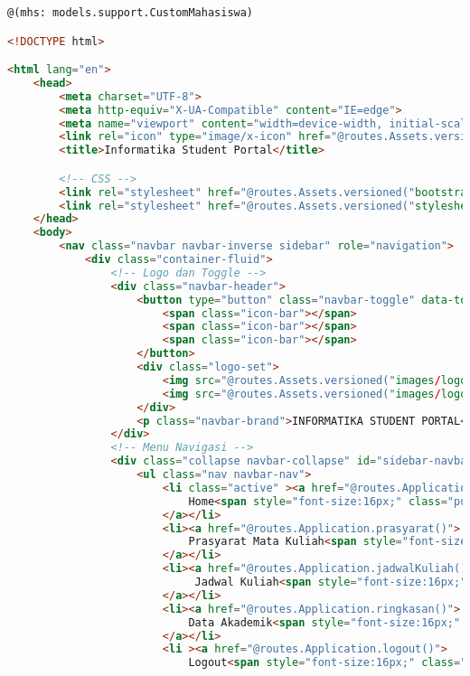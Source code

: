 \singlespacing 
\begin{lstlisting}[language=html,basicstyle=\tiny,caption=home.scala.html]
@(mhs: models.support.CustomMahasiswa)

<!DOCTYPE html>

<html lang="en">
    <head>
        <meta charset="UTF-8">
		<meta http-equiv="X-UA-Compatible" content="IE=edge">
        <meta name="viewport" content="width=device-width, initial-scale=1">
        <link rel="icon" type="image/x-icon" href="@routes.Assets.versioned("images/logo-IT.png")" />
		<title>Informatika Student Portal</title>

		<!-- CSS -->
        <link rel="stylesheet" href="@routes.Assets.versioned("bootstrap/css/bootstrap.min.css")">
        <link rel="stylesheet" href="@routes.Assets.versioned("stylesheets/main.css")"> 
    </head>
    <body>
		<nav class="navbar navbar-inverse sidebar" role="navigation">
			<div class="container-fluid">
				<!-- Logo dan Toggle -->
				<div class="navbar-header">
					<button type="button" class="navbar-toggle" data-toggle="collapse" data-target="#sidebar-navbar-collapse">
						<span class="icon-bar"></span>
						<span class="icon-bar"></span>
						<span class="icon-bar"></span>
					</button>
					<div class="logo-set">
						<img src="@routes.Assets.versioned("images/logo-unpar.png")" width="25%" height="25%"/>
						<img src="@routes.Assets.versioned("images/logo-IT.png")" width="25%" height="25%"/>
					</div>
					<p class="navbar-brand">INFORMATIKA STUDENT PORTAL</p>
				</div>
				<!-- Menu Navigasi -->
				<div class="collapse navbar-collapse" id="sidebar-navbar-collapse">
					<ul class="nav navbar-nav">
						<li class="active" ><a href="@routes.Application.home()">
							Home<span style="font-size:16px;" class="pull-right hidden-xs showopacity glyphicon glyphicon-home"></span>
						</a></li>
						<li><a href="@routes.Application.prasyarat()">
							Prasyarat Mata Kuliah<span style="font-size:16px;" class="pull-right hidden-xs showopacity glyphicon glyphicon-tasks"></span>
						</a></li>
						<li><a href="@routes.Application.jadwalKuliah()">
							 Jadwal Kuliah<span style="font-size:16px;" class="pull-right hidden-xs showopacity glyphicon glyphicon-calendar"></span>
						</a></li>
						<li><a href="@routes.Application.ringkasan()">
							Data Akademik<span style="font-size:16px;" class="pull-right hidden-xs showopacity glyphicon glyphicon-book"></span>
						</a></li>
						<li ><a href="@routes.Application.logout()">
							Logout<span style="font-size:16px;" class="pull-right hidden-xs showopacity glyphicon glyphicon-log-out"></span>

\end{lstlisting}
